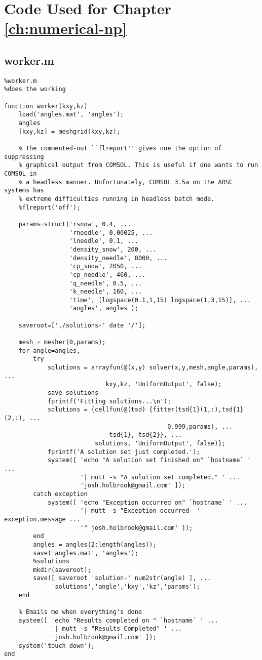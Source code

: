 \chapter{Code Used for Chapter \ref{ch:numerical-np}}
\label{apx:numerical-np}

\section{worker.m}
\small
\begin{verbatim}
%worker.m
%does the working

function worker(kxy,kz)
    load('angles.mat', 'angles');
    angles
    [kxy,kz] = meshgrid(kxy,kz);

    % The commented-out ``flreport'' gives one the option of suppressing
    % graphical output from COMSOL. This is useful if one wants to run COMSOL in
    % a headless manner. Unfortunately, COMSOL 3.5a on the ARSC systems has
    % extreme difficulties running in headless batch mode.
    %flreport('off');

    params=struct('rsnow', 0.4, ...
                  'rneedle', 0.00025, ...
                  'lneedle', 0.1, ...
                  'density_snow', 200, ...
                  'density_needle', 8000, ...
                  'cp_snow', 2050, ...
                  'cp_needle', 460, ...
                  'q_needle', 0.5, ...
                  'k_needle', 160, ...
                  'time', [logspace(0.1,1,15) logspace(1,3,15)], ...
                  'angles', angles );

    saveroot=['./solutions-' date '/'];

    mesh = mesher(0,params);
    for angle=angles,
        try
            solutions = arrayfun(@(x,y) solver(x,y,mesh,angle,params), ...
                            kxy,kz, 'UniformOutput', false);
            save solutions
            fprintf('Fitting solutions...\n');
            solutions = {cellfun(@(tsd) {fitter(tsd{1}(1,:),tsd{1}(2,:), ...
                                             0.999,params), ...
                             tsd{1}, tsd{2}}, ...
                         solutions, 'UniformOutput', false)};
            fprintf('A solution set just completed.');
            system([ 'echo "A solution set finished on" `hostname` ' ...
                     '| mutt -s "A solution set completed." ' ...
                     'josh.holbrook@gmail.com' ]);
        catch exception
            system([ 'echo "Exception occurred on" `hostname` ' ...
                     '| mutt -s "Exception occurred--' exception.message ...
                     '" josh.holbrook@gmail.com' ]);
        end
        angles = angles(2:length(angles));
        save('angles.mat', 'angles');
        %solutions
        mkdir(saveroot);
        save([ saveroot 'solution-' num2str(angle) ], ...
             'solutions','angle','kxy','kz','params');
    end

    % Emails me when everything's done
    system([ 'echo "Results completed on " `hostname` ' ...
             '| mutt -s "Results Completed" ' ...
             'josh.holbrook@gmail.com' ]);
    system('touch down');
end
\end{verbatim}
\normalsize



